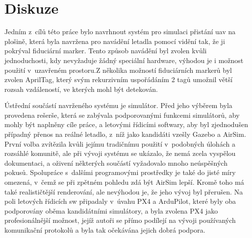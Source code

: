 \chapter{Diskuze} \label{chap:discussion}



Jedním z~cílů této práce bylo navrhnout systém pro simulaci přistání \acrshort{uav} na plošině, která byla navržena pro navádění letadla pomocí vidění tak, že ji pokrýval fiduciární marker. Tento způsob navádění byl zvolen kvůli jednoduchosti, kdy nevyžaduje žádný speciální hardware, výhodou je i možnost použití v~uzavřeném prostoru.Z několika možností fiduciárních markerů byl zvolen AprilTag, který svým rekurzivním uspořádáním 2 tagů umožnil větší rozsah vzdáleností, ve kterých mohl být detekován.

Ústřední součástí navrženého systému je simulátor. Před jeho výběrem byla provedena rešerše, která se zabývala podporovanými funkcemi simulátorů, aby mohly být naplněny cíle práce, a letovými řídicími softwary, aby byl zjednodušen případný přenos na reálné letadlo, z~níž jako kandidáti vzešly Gazebo a AirSim. První volba zvítězila kvůli jejímu tradičnímu použití v~podobných úlohách a rozsáhlé komunitě, ale při vývoji systému se ukázalo, že nemá zcela vyspělou dokumentaci, a oživení některých součástí vyžadovalo mnoho neúspěšných pokusů. Spolupráce s~dalšími programovými prostředky je také do jisté míry omezená, v~čemž se při zpětném pohledu zdá být AirSim lepší. Kromě toho má také realističtější renderování, ale nevýhodou je, že jeho vývoj byl přerušen. Na poli letových řídicích \acrshort{sw} připadaly v~úvahu PX4 a ArduPilot, které byly oba podporovány oběma kandidátními simulátory, a byla zvolena PX4 jako profesionálnější možnost, jejíž autoři se přímo podílejí na vývoji používaných komunikační protokolů a byla tak očekávána jejich dobrá podpora.

